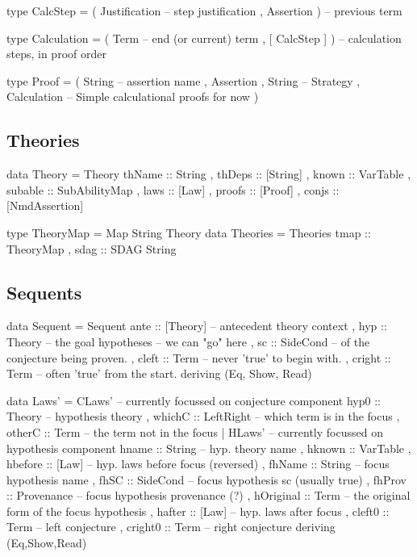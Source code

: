 \begin{code}
type CalcStep
  = ( Justification  -- step justification
    , Assertion )         -- previous term
\end{code}

\begin{code}
type Calculation
  = ( Term -- end (or current) term
    , [ CalcStep ] )  -- calculation steps, in proof order
\end{code}

\begin{code}
type Proof
  = ( String -- assertion name
    , Assertion
    , String -- Strategy
    , Calculation -- Simple calculational proofs for now
    )
\end{code}


\subsection{Theories}

\begin{code}
data Theory
  = Theory {
      thName   :: String
    , thDeps   :: [String]
    , known    :: VarTable
    , subable  :: SubAbilityMap
    , laws     :: [Law]
    , proofs   :: [Proof]
    , conjs    :: [NmdAssertion]
    }
\end{code}

\begin{code}
type TheoryMap = Map String Theory
data Theories
  = Theories { tmap :: TheoryMap
             , sdag :: SDAG String }
\end{code}

\subsection{Sequents}

\begin{code}
data Sequent
  = Sequent {
     ante :: [Theory] -- antecedent theory context
   , hyp :: Theory -- the goal hypotheses -- we can "go" here
   , sc :: SideCond -- of the conjecture being proven.
   , cleft :: Term -- never 'true' to begin with.
   , cright :: Term -- often 'true' from the start.
   }
  deriving (Eq, Show, Read)
\end{code}

\begin{code}
data Laws'
  = CLaws' { -- currently focussed on conjecture component
      hyp0  :: Theory -- hypothesis theory
    , whichC :: LeftRight -- which term is in the focus
    , otherC :: Term  -- the term not in the focus
    }
  | HLaws' { -- currently focussed on hypothesis component
      hname     :: String -- hyp. theory name
    , hknown    :: VarTable
    , hbefore   :: [Law] -- hyp. laws before focus (reversed)
    , fhName    :: String -- focus hypothesis name
    , fhSC      :: SideCond -- focus hypothesis sc (usually true)
    , fhProv    :: Provenance -- focus hypothesis provenance (?)
    , hOriginal :: Term -- the original form of the focus hypothesis
    , hafter    :: [Law] -- hyp. laws after focus
    , cleft0    :: Term -- left conjecture
    , cright0   :: Term -- right conjecture
    }
  deriving (Eq,Show,Read)
\end{code}

